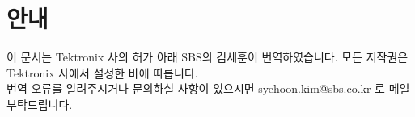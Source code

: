 \documentclass[10pt,twocolumn,a4paper]{book}
\begin{document}
\null

\thispagestyle{empty}

\tableofcontents

\onecolumn
\section{안내}
이 문서는 Tektronix 사의 허가 아래 SBS의 김세훈이 번역하였습니다. 모든 저작권은 Tektronix 사에서 설정한 바에 따릅니다.
\\
번역 오류를 알려주시거나 문의하실 사항이 있으시면 syehoon.kim@sbs.co.kr 로 메일 부탁드립니다.

\twocolumn





















\printindex
\end{document}
